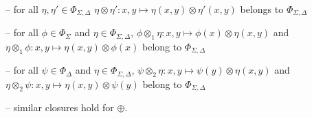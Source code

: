 \noindent --
for all $\eta, \eta' \in \Phi_{\Sigma, \Delta}$
$\eta \otimes \eta': x, y \mapsto \eta(x, y) \otimes \eta'(x, y)$ belongs to $\Phi_{\Sigma, \Delta}$

\noindent --
for all $\phi \in \Phi_\Sigma$ and $\eta \in \Phi_{\Sigma, \Delta}$,
$\phi \otimes_1 \eta: x, y \mapsto \phi(x) \otimes \eta(x, y)$ and\\
\phantom{--} $\eta \otimes_1 \phi: x, y \mapsto \eta(x, y) \otimes \phi(x)$
belong to $\Phi_{\Sigma, \Delta}$

\noindent --
for all $\psi \in \Phi_\Delta$ and $\eta \in \Phi_{\Sigma, \Delta}$,
$\psi \otimes_2 \eta: x, y \mapsto \psi(y) \otimes \eta(x, y)$ and\\
\phantom{--} $\eta \otimes_2 \psi: x, y \mapsto \eta(x, y) \otimes \psi(y)$
belong to $\Phi_{\Sigma, \Delta}$

\noindent --
similar closures hold for $\oplus$.


